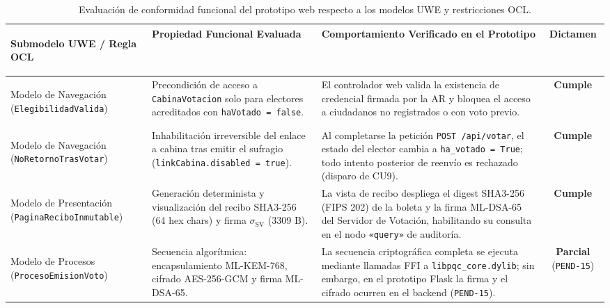 \begin{table}[!htbp]
	\centering
	\renewcommand{\arraystretch}{1.28}
	\footnotesize
	\begin{tabularx}{\textwidth}{|>{\bfseries\raggedright\arraybackslash}p{3.0cm}|>{\raggedright\arraybackslash}p{3.8cm}|>{\raggedright\arraybackslash}X|c|}
		\hline
		\textbf{Submodelo UWE / Regla OCL} & \textbf{Propiedad Funcional Evaluada} & \textbf{Comportamiento Verificado en el Prototipo} & \textbf{Dictamen} \\
		\hline
		Modelo de Navegación \newline (\texttt{ElegibilidadValida}) & Precondición de acceso a \texttt{CabinaVotacion} solo para electores acreditados con \texttt{haVotado = false}. & El controlador web valida la existencia de credencial firmada por la AR y bloquea el acceso a ciudadanos no registrados o con voto previo. & \textbf{Cumple} \\
		\hline
		Modelo de Navegación \newline (\texttt{NoRetornoTrasVotar}) & Inhabilitación irreversible del enlace a cabina tras emitir el sufragio (\texttt{linkCabina.disabled = true}). & Al completarse la petición \texttt{POST /api/votar}, el estado del elector cambia a \texttt{ha\_votado = True}; todo intento posterior de reenvío es rechazado (disparo de CU9). & \textbf{Cumple} \\
		\hline
		Modelo de Presentación \newline (\texttt{PaginaReciboInmutable}) & Generación determinista y visualización del recibo SHA3-256 (64 hex chars) y firma $\sigma_{\text{SV}}$ (3309 B). & La vista de recibo despliega el digest SHA3-256 (FIPS 202) de la boleta y la firma ML-DSA-65 del Servidor de Votación, habilitando su consulta en el nodo \texttt{«query»} de auditoría. & \textbf{Cumple} \\
		\hline
		Modelo de Procesos \newline (\texttt{ProcesoEmisionVoto}) & Secuencia algorítmica: encapsulamiento ML-KEM-768, cifrado AES-256-GCM y firma ML-DSA-65. & La secuencia criptográfica completa se ejecuta mediante llamadas FFI a \texttt{libpqc\_core.dylib}; sin embargo, en el prototipo Flask la firma y el cifrado ocurren en el backend (\texttt{PEND-15}). & \textbf{Parcial} \newline (\texttt{PEND-15}) \\
		\hline
	\end{tabularx}
	\caption{Evaluación de conformidad funcional del prototipo web respecto a los modelos UWE y restricciones OCL.}
	\label{tab:evaluacion_conformidad_uwe}
	\par{}
\end{table}

